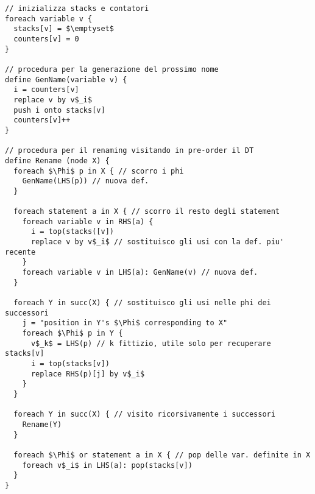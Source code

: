 \begin{lstlisting}[morekeywords={foreach,statement,node,variable,in,remove,from,insert,defined,replace,define,push,onto,by}]
// inizializza stacks e contatori
foreach variable v {
  stacks[v] = $\emptyset$
  counters[v] = 0
}

// procedura per la generazione del prossimo nome
define GenName(variable v) {
  i = counters[v]
  replace v by v$_i$
  push i onto stacks[v]
  counters[v]++
}

// procedura per il renaming visitando in pre-order il DT
define Rename (node X) {
  foreach $\Phi$ p in X { // scorro i phi
    GenName(LHS(p)) // nuova def.
  } 

  foreach statement a in X { // scorro il resto degli statement
    foreach variable v in RHS(a) {
      i = top(stacks([v])
      replace v by v$_i$ // sostituisco gli usi con la def. piu' recente
    }
    foreach variable v in LHS(a): GenName(v) // nuova def.
  }

  foreach Y in succ(X) { // sostituisco gli usi nelle phi dei successori
    j = "position in Y's $\Phi$ corresponding to X"
    foreach $\Phi$ p in Y { 
      v$_k$ = LHS(p) // k fittizio, utile solo per recuperare stacks[v]
      i = top(stacks[v])
      replace RHS(p)[j] by v$_i$
    }
  }

  foreach Y in succ(X) { // visito ricorsivamente i successori
    Rename(Y)
  }

  foreach $\Phi$ or statement a in X { // pop delle var. definite in X
    foreach v$_i$ in LHS(a): pop(stacks[v])
  }
}\end{lstlisting}



